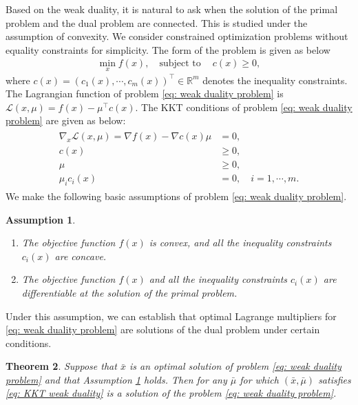 \documentclass[sn-mathphys]{JORSC-jnl}%
\theoremstyle{thmstyleone}%
\newtheorem{theorem}{Theorem}%
\newtheorem{assumption}[theorem]{Assumption}
\theoremstyle{thmstylethree}%
\begin{document}
Based on the weak duality, it is natural to ask when the solution of the primal problem and the dual problem are connected. This is studied under the assumption of convexity. We consider constrained optimization problems without equality constraints for simplicity. The form of the problem is given as below
\begin{align}\label{eq: weak duality problem}
    \min\limits_x f(x) , \quad \text{subject to}\  \quad c(x) \geq 0,
\end{align}
where $c(x) = (c_1(x), \cdots, c_m(x))^\top \in \mathbb{R}^m$ denotes the inequality constraints. The Lagrangian function of problem \eqref{eq: weak duality problem} is $\mathcal{L}(x,\mu) = f(x) - \mu^\top c(x)$. The KKT conditions of problem \eqref{eq: weak duality problem} are given as below:
\begin{align}\label{eq: KKT weak duality}
\begin{aligned}
    \nabla_x \mathcal{L}(x,\mu) = \nabla f(x) - \nabla c(x) \mu &= 0, \\
    c(x) &\geq 0,\\
    \mu &\geq 0, \\
    \mu_i c_i(x) &= 0, \quad i=1,\cdots, m.
\end{aligned}
\end{align}
We make the following basic assumptions of  problem \eqref{eq: weak duality problem}. 
\begin{assumption} \label{assump: weak duality}
    \begin{enumerate}
        \item The objective function $f(x)$ is convex, and all the inequality constraints $c_i(x)$ are concave.
        \item The objective function $f(x)$ and all the inequality constraints $c_i(x)$ are differentiable at the solution of the primal problem.
    \end{enumerate}
\end{assumption}
Under this assumption, we can establish that optimal Lagrange multipliers for \eqref{eq: weak duality problem} are solutions of the dual problem under certain conditions.
\begin{theorem}\label{thm: KKT dual}
    Suppose that $\bar{x}$ is an optimal solution of problem \eqref{eq: weak duality problem} and that Assumption \ref{assump: weak duality} holds. Then for any $\bar{\mu}$ for which $(\bar{x}, \bar{\mu})$ satisfies \eqref{eq: KKT weak duality} is a solution of the problem \eqref{eq: weak duality problem}.
\end{theorem}
\end{document}
